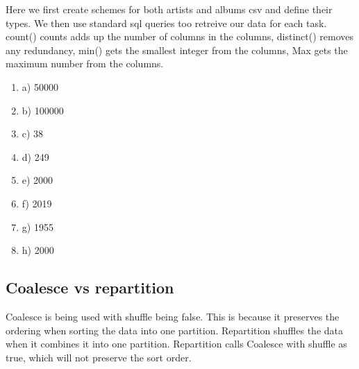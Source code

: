 \documentclass[12pt]{article}
\begin{document}
Here we first create schemes for both artists and albums csv and define their types. We then use standard sql queries too retreive our data for each task. count() counts adds up the number of columns in the columns, distinct() removes any redundancy, min() gets the smallest integer from the columns, Max gets the maximum number from the columns.
\begin{enumerate} 
    \item a) 50000
    \item b) 100000
    \item c) 38
    \item d) 249
    \item e) 2000
    \item f) 2019
    \item g) 1955
    \item h) 2000
\end{enumerate}

\subsection{Coalesce vs repartition}

Coalesce is being used with shuffle being false. This is because it preserves the ordering when sorting the data into one partition. Repartition shuffles the data when it combines it into one partition. Repartition calls Coalesce with shuffle as true, which will not preserve the sort order.
\end{document}
